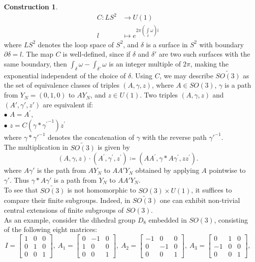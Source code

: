 \documentclass{article}
\theoremstyle{plain}
\theoremstyle{definition}
\newtheorem{const}[thm]{Construction}
\begin{document}
\begin{const}
\begin{align}
C : LS^2 & \longrightarrow U(1) \nonumber \\
l ~~ & \mapsto e^{2\pi(\int\limits_\delta \omega)\mathsf{i}} \label{themapC}
\end{align}
where $LS^2$ denotes the loop space of $S^2$, and $\delta$ is a surface in $S^2$ with boundary $\partial \delta = l$. The map $C$ is well-defined, since if $\delta$ and $\delta'$ are two such surfaces with the same boundary, then $\int_\delta \omega - \int_{\delta'} \omega$ is an integer multiple of $2\pi$, making the exponential independent of the choice of $\delta$.
Using $C$, we may describe $\widetilde{SO(3)}$ as the set of equivalence classes of triples $(A,\gamma,z)$, where $A\in SO(3)$, $\gamma$ is a path from $Y_N=(0,1,0)$ to $AY_N$, and $z\in U(1)$. Two triples $(A,\gamma,z)$ and $(A',\gamma',z')$ are equivalent if: \\
$\bullet$ $A = A^\prime$, \\
$\bullet$ $z = C(\gamma * {\gamma^\prime}^{-1}) z^\prime$ \\
where $\gamma * \gamma'^{-1}$ denotes the concatenation of $\gamma$ with the reverse path $\gamma'^{-1}$. \\
The multiplication in $\widetilde{SO(3)}$ is given by
\[
(A,\gamma,z) \cdot (A^\prime,\gamma^\prime,z^\prime) \coloneq (AA^\prime,\gamma * A\gamma^\prime,zz^\prime).
\]
where $A\gamma'$ is the path from $AY_N$ to $AA'Y_N$ obtained by applying $A$ pointwise to $\gamma'$. Thus $\gamma * A\gamma'$ is a path from $Y_N$ to $AA'Y_N$. \\
To see that $\widetilde{SO(3)}$ is not homomorphic to $SO(3)\times U(1)$, it suffices to compare their finite subgroups. Indeed, in $\widetilde{SO(3)}$ one can exhibit non-trivial central extensions of finite subgroups of $SO(3)$. \\
As an example, consider the dihedral group $D_8$ embedded in $SO(3)$, consisting of the following eight matrices:
\[
I = \begin{bmatrix} 1 & 0 & 0 \\ 0 & 1 & 0 \\ 0 & 0 & 1  \end{bmatrix}, ~ A_1=\begin{bmatrix} 0 & -1 & 0 \\ 1 & 0 & 0 \\ 0 & 0 & 1  \end{bmatrix}, ~ A_2=\begin{bmatrix} -1 & 0 & 0 \\ 0 & -1 & 0 \\ 0 & 0 & 1  \end{bmatrix}, ~ A_3=\begin{bmatrix} 0 & 1 & 0 \\ -1 & 0 & 0 \\ 0 & 0 & 1  \end{bmatrix},
\]
\end{const}
\end{document}
